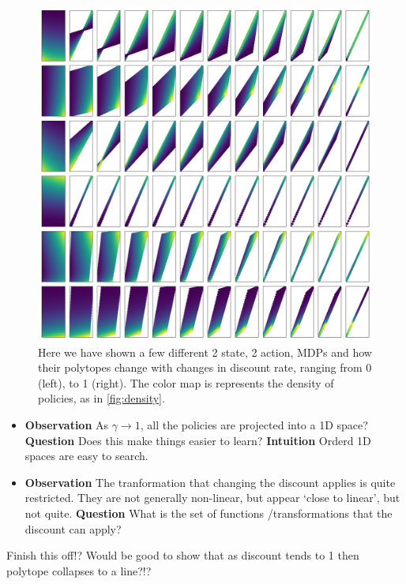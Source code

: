 \begin{figure}
\centering
\includegraphics[width=1\textwidth,height=1\textheight]{../../pictures/figures/discounts.png}
\caption{Here we have shown a few different 2 state, 2 action, MDPs and how
their polytopes change with changes in discount rate, ranging from 0 (left), to 1 (right).
The color map is represents the density of policies, as in \ref{fig:density}.}
\label{fig:polytope-discounts}
\end{figure}

\begin{itemize}
\item
  \textbf{Observation} As \(\gamma \to 1\), all the policies are
  projected into a 1D space? \textbf{Question} Does this make things
  easier to learn? \textbf{Intuition} Orderd 1D spaces are easy to
  search.
\item
  \textbf{Observation} The tranformation that changing the discount
  applies is quite restricted. They are not generally non-linear, but
  appear `close to linear', but not quite. \textbf{Question} What is the
  set of functions /transformations that the discount can apply?
\end{itemize}

{\color{red}Finish this off!? Would be good to show that as discount tends to 1 then polytope collapses to a line?!?}

